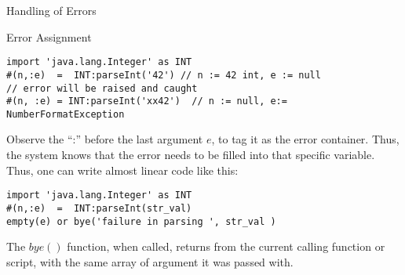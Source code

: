 \begin{section}{Handling of Errors}
\begin{subsection}{Error Assignment}
\begin{lstlisting}[style=JexlStyle]
import 'java.lang.Integer' as INT 
#(n,:e)  =  INT:parseInt('42') // n := 42 int, e := null 
// error will be raised and caught 
#(n, :e) = INT:parseInt('xx42')  // n := null, e:= NumberFormatException 
\end{lstlisting}

Observe the ``:'' before the last argument $e$, to tag it as the error container.
Thus, the system knows that the error needs to be filled into that specific variable.
Thus, one can write almost linear code like this:
\begin{center}\begin{minipage}{\linewidth}
\begin{lstlisting}[style=JexlStyle]
import 'java.lang.Integer' as INT 
#(n,:e)  =  INT:parseInt(str_val)
empty(e) or bye('failure in parsing ', str_val )  
\end{lstlisting}
\end{minipage}\end{center}

The $bye()$ function, when called, returns from the current calling function or script,
with the same array of argument it was passed with. 

\end{subsection}
\end{section}

